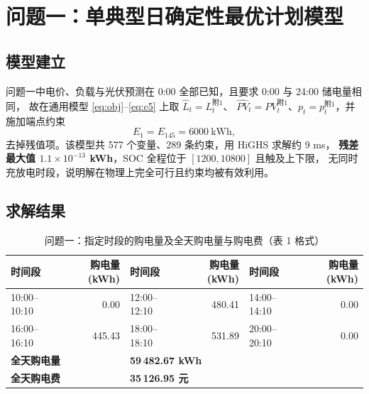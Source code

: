 \section{问题一\nobreak：单典型日确定性最优计划模型}
\label{sec:q1}

\subsection{模型建立}

问题一中电价\nobreak、负载与光伏预测在 0:00 全部已知\nobreak，且要求 0:00 与 24:00 储电量相同\nobreak，
故在通用模型 \eqref{eq:obj}--\eqref{eq:c5} 上取 $\hat L_t=L_t^{\text{附1}}$\nobreak、
$\hat{PV}_t=PV_t^{\text{附1}}$\nobreak、$p_t=p_t^{\text{附1}}$\nobreak，并施加端点约束
\begin{equation}
E_1 = E_{145} = 6000\ \text{kWh},
\label{eq:q1end}
\end{equation}
去掉残值项\nobreak。该模型共 577 个变量\nobreak、289 条约束\nobreak，用 HiGHS 求解约 9 ms\nobreak，
\textbf{残差最大值 $1.1\times10^{-13}$ kWh}\nobreak，SOC 全程位于 $[1200,10800]$ 且触及上下限\nobreak，
无同时充放电时段\nobreak，说明解在物理上完全可行且约束均被有效利用\nobreak。

\subsection{求解结果}

\begin{table}[htbp]
\centering
\caption{问题一\nobreak：指定时段的购电量及全天购电量与购电费（表 1 格式\nobreak）}
\label{tab:q1a}
\begin{tabular}{@{}lrlrlr@{}}
\toprule
时间段 & 购电量(kWh) & 时间段 & 购电量(kWh) & 时间段 & 购电量(kWh) \\
\midrule
10:00--10:10 & 0.00 & 12:00--12:10 & 480.41 & 14:00--14:10 & 0.00 \\
16:00--16:10 & 445.43 & 18:00--18:10 & 531.89 & 20:00--20:10 & 0.00 \\
\multicolumn{2}{l}{\textbf{全天购电量}} & \multicolumn{4}{l}{\textbf{59\,482.67 kWh}} \\
\multicolumn{2}{l}{\textbf{全天购电费}} & \multicolumn{4}{l}{\textbf{35\,126.95 元}} \\
\bottomrule
\end{tabular}
\end{table}

